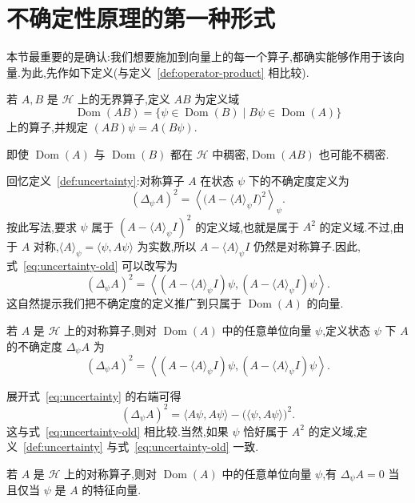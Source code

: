 \section{不确定性原理的第一种形式}
\label{sec:uncertainty-first}

本节最重要的是确认:我们想要施加到向量上的每一个算子,都确实能够作用于该向量.为此,先作如下定义(与定义~\ref{def:operator-product} 相比较).

\begin{definition}[无界算子的乘积]\label{def:operator-product}
若 $A,B$ 是 $\mathcal H$ 上的无界算子,定义 $AB$ 为定义域
\[
\operatorname{Dom}(AB)=\{\psi\in\operatorname{Dom}(B)\mid B\psi\in\operatorname{Dom}(A)\}
\]
上的算子,并规定 $(AB)\psi=A(B\psi)$.
\end{definition}

即使 $\operatorname{Dom}(A)$ 与 $\operatorname{Dom}(B)$ 都在 $\mathcal H$ 中稠密,$\operatorname{Dom}(AB)$ 也可能不稠密.

回忆定义~\ref{def:uncertainty}:对称算子 $A$ 在状态 $\psi$ 下的不确定度定义为
\[
(\Delta_\psi A)^2=\left\langle\bigl(A-\langle A\rangle_\psi I\bigr)^2\right\rangle_\psi.
\label{eq:uncertainty-old}
\]
按此写法,要求 $\psi$ 属于 $(A-\langle A\rangle_\psi I)^2$ 的定义域,也就是属于 $A^2$ 的定义域.不过,由于 $A$ 对称,$\langle A\rangle_\psi=\langle\psi,A\psi\rangle$ 为实数,所以 $A-\langle A\rangle_\psi I$ 仍然是对称算子.因此,式~\eqref{eq:uncertainty-old} 可以改写为
\[
(\Delta_\psi A)^2
=\left\langle (A-\langle A\rangle_\psi I)\psi,
(A-\langle A\rangle_\psi I)\psi\right\rangle.
\]
这自然提示我们把不确定度的定义推广到只属于 $\operatorname{Dom}(A)$ 的向量.

\begin{definition}[不确定度]\label{def:uncertainty}
若 $A$ 是 $\mathcal H$ 上的对称算子,则对 $\operatorname{Dom}(A)$ 中的任意单位向量 $\psi$,定义状态 $\psi$ 下 $A$ 的不确定度 $\Delta_\psi A$ 为
\[
(\Delta_\psi A)^2
=\left\langle (A-\langle A\rangle_\psi I)\psi,
(A-\langle A\rangle_\psi I)\psi\right\rangle.
\label{eq:uncertainty}
\]
\end{definition}

展开式~\eqref{eq:uncertainty} 的右端可得
\[
(\Delta_\psi A)^2=\langle A\psi,A\psi\rangle-\bigl(\langle\psi,A\psi\rangle\bigr)^2.
\label{eq:uncertainty-expanded}
\]
这与式~\eqref{eq:uncertainty-old} 相比较.当然,如果 $\psi$ 恰好属于 $A^2$ 的定义域,定义~\ref{def:uncertainty} 与式~\eqref{eq:uncertainty-old} 一致.

\begin{proposition}[零不确定度与特征向量]\label{prop:zero-uncertainty}
若 $A$ 是 $\mathcal H$ 上的对称算子,则对 $\operatorname{Dom}(A)$ 中的任意单位向量 $\psi$,有 $\Delta_\psi A=0$ 当且仅当 $\psi$ 是 $A$ 的特征向量.
\end{proposition}

